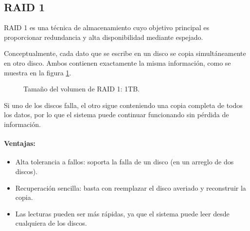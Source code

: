 \subsection{RAID 1}

RAID 1 es una técnica de almacenamiento cuyo objetivo principal es proporcionar redundancia y alta disponibilidad mediante espejado.

Conceptualmente, cada dato que se escribe en un disco se copia simultáneamente en otro disco. Ambos contienen exactamente la misma información, como se muestra en la figura \ref{fig:raid1}.

\begin{figure}[!ht]
  \centering
  \caption{Tamaño del volumen de RAID 1: 1TB.}
  \label{fig:raid1}
\end{figure}
Si uno de los discos falla, el otro sigue conteniendo una copia completa de todos los datos, por lo que el sistema puede continuar funcionando sin pérdida de información.

\paragraph{Ventajas:}
\begin{itemize}
  \item Alta tolerancia a fallos: soporta la falla de un disco (en un arreglo de dos discos).
  \item Recuperación sencilla: basta con reemplazar el disco averiado y reconstruir la copia.
  \item Las lecturas pueden ser más rápidas, ya que el sistema puede leer desde cualquiera de los discos.
\end{itemize}

